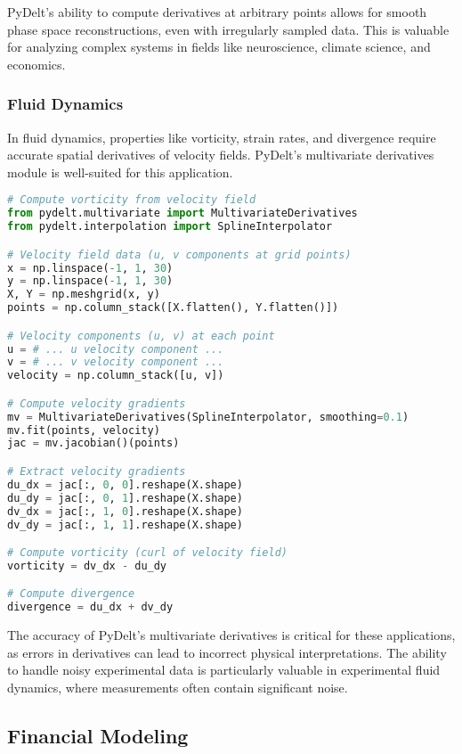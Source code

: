 \documentclass[11pt,a4paper]{article}
\begin{document}
PyDelt's ability to compute derivatives at arbitrary points allows for smooth phase space reconstructions, even with irregularly sampled data. This is valuable for analyzing complex systems in fields like neuroscience, climate science, and economics.

\subsubsection{Fluid Dynamics}

In fluid dynamics, properties like vorticity, strain rates, and divergence require accurate spatial derivatives of velocity fields. PyDelt's multivariate derivatives module is well-suited for this application.

\begin{lstlisting}[language=Python, caption=Fluid dynamics example]
# Compute vorticity from velocity field
from pydelt.multivariate import MultivariateDerivatives
from pydelt.interpolation import SplineInterpolator

# Velocity field data (u, v components at grid points)
x = np.linspace(-1, 1, 30)
y = np.linspace(-1, 1, 30)
X, Y = np.meshgrid(x, y)
points = np.column_stack([X.flatten(), Y.flatten()])

# Velocity components (u, v) at each point
u = # ... u velocity component ...
v = # ... v velocity component ...
velocity = np.column_stack([u, v])

# Compute velocity gradients
mv = MultivariateDerivatives(SplineInterpolator, smoothing=0.1)
mv.fit(points, velocity)
jac = mv.jacobian()(points)

# Extract velocity gradients
du_dx = jac[:, 0, 0].reshape(X.shape)
du_dy = jac[:, 0, 1].reshape(X.shape)
dv_dx = jac[:, 1, 0].reshape(X.shape)
dv_dy = jac[:, 1, 1].reshape(X.shape)

# Compute vorticity (curl of velocity field)
vorticity = dv_dx - du_dy

# Compute divergence
divergence = du_dx + dv_dy
\end{lstlisting}

The accuracy of PyDelt's multivariate derivatives is critical for these applications, as errors in derivatives can lead to incorrect physical interpretations. The ability to handle noisy experimental data is particularly valuable in experimental fluid dynamics, where measurements often contain significant noise.

\subsection{Financial Modeling}
\end{document}

